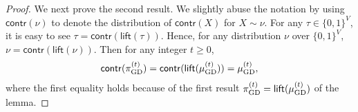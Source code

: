 \documentclass[11pt,a4paper]{article}
\theoremstyle{definition}
\begin{document}
\begin{proof}
    We next prove the second result. We slightly abuse the notation by using $\textsf{contr}(\nu)$ to denote the distribution of $\textsf{contr}(X)$ for $X \sim \nu$. 
    For any $\tau \in \{0,1\}^V$, it is easy to see $\tau = \textsf{contr}(\textsf{lift}(\tau))$. 
    Hence, for any distribution $\nu$ over $\{0,1\}^V$,  $\nu  =\textsf{contr}(\textsf{lift}(\nu))$. Then for any integer $t\geq 0$, 
    \begin{align*}
    \textnormal{\textsf{contr}}(\pi^{(t)}_{\textnormal{GD}}) = \textnormal{\textsf{contr}}(\textsf{lift}(\mu^{(t)}_{\textnormal{GD}}))= \mu^{(t)}_{\textnormal{GD}}, 
    \end{align*}
    where the first equality holds because of the first result $\pi^{(t)}_{\textnormal{GD}} = \textsf{lift}(\mu^{(t)}_{\textnormal{GD}})$ of the lemma.
    \end{proof}
\end{document}
